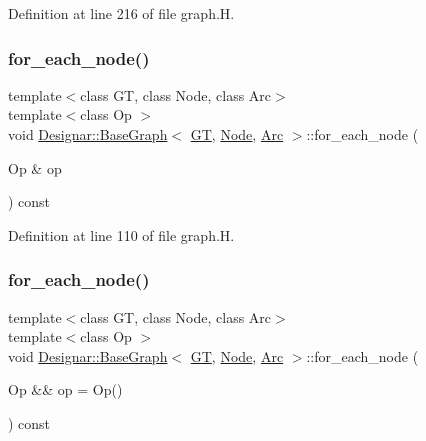 Definition at line 216 of file graph.\+H.

\mbox{\label{class_designar_1_1_base_graph_a9497531ac221edb5c5ef19888f78ad3c}} 
\subsubsection{\texorpdfstring{for\+\_\+each\+\_\+node()}{for\_each\_node()}\hspace{0.1cm}{\footnotesize\ttfamily [1/2]}}
{\footnotesize\ttfamily template$<$class GT, class Node, class Arc$>$ \\
template$<$class Op $>$ \\
void \hyperlink{class_designar_1_1_base_graph}{Designar\+::\+Base\+Graph}$<$ \hyperlink{demo-buildgraph_8_c_a3001c40d2c31ca87ed96cd7d1334a55e}{GT}, \hyperlink{namespace_designar_a5af326c65aa2bd26b26c410f2030d09e}{Node}, \hyperlink{namespace_designar_a3f55fb5513d62ff47cbc8f72b8e95d6f}{Arc} $>$\+::for\+\_\+each\+\_\+node (\begin{DoxyParamCaption}\item[{Op \&}]{op }\end{DoxyParamCaption}) const\hspace{0.3cm}{\ttfamily [inline]}}



Definition at line 110 of file graph.\+H.

\mbox{\label{class_designar_1_1_base_graph_aab8f765719514803f426b03939f519a1}} 
\subsubsection{\texorpdfstring{for\+\_\+each\+\_\+node()}{for\_each\_node()}\hspace{0.1cm}{\footnotesize\ttfamily [2/2]}}
{\footnotesize\ttfamily template$<$class GT, class Node, class Arc$>$ \\
template$<$class Op $>$ \\
void \hyperlink{class_designar_1_1_base_graph}{Designar\+::\+Base\+Graph}$<$ \hyperlink{demo-buildgraph_8_c_a3001c40d2c31ca87ed96cd7d1334a55e}{GT}, \hyperlink{namespace_designar_a5af326c65aa2bd26b26c410f2030d09e}{Node}, \hyperlink{namespace_designar_a3f55fb5513d62ff47cbc8f72b8e95d6f}{Arc} $>$\+::for\+\_\+each\+\_\+node (\begin{DoxyParamCaption}\item[{Op \&\&}]{op = {\ttfamily Op()} }\end{DoxyParamCaption}) const\hspace{0.3cm}{\ttfamily [inline]}}



